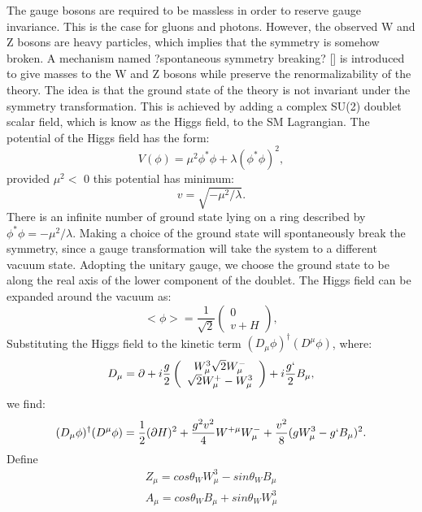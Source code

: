 \documentclass[thesis.tex]{subfiles}
\begin{document}
 
The gauge bosons are required to be massless in order to reserve gauge invariance. 
This is the case for gluons and photons. However, the observed W and Z bosons are heavy particles, which implies that the symmetry is somehow broken. 
A mechanism named ?spontaneous symmetry breaking? [] is introduced to give masses to the W and Z bosons while preserve the renormalizability of the theory. 
The idea is that the ground state of the theory is not invariant under the symmetry transformation.
This is achieved by adding a complex SU(2) doublet scalar field, which is know as the Higgs field, to the SM Lagrangian. 
The potential of the Higgs field has the form: 
	\begin{equation}
		V(\phi) = \mu^2\phi^*\phi + \lambda(\phi^*\phi)^2,
	\end{equation}
provided $\mu^2 <$ 0 this potential has minimum: 
	\begin{equation}
		v = \sqrt{ -\mu^2/\lambda}.
	\end{equation}
There is an infinite number of ground state lying on a ring described by $\phi^*\phi = - \mu^2/\lambda$. 
Making a choice of the ground state will spontaneously break the symmetry, since a gauge transformation will take the system to a different vacuum state. 
Adopting the unitary gauge, we choose the ground state to be along the real axis of the lower component of the doublet.
The Higgs field can be expanded around the vacuum as:
	\begin{equation}
		<\phi> = \frac{1}{\sqrt{2}} \left( \begin{array}{c} 0\\v+H \end{array} \right),
	\end{equation}
Substituting the Higgs field to the kinetic term $(D_\mu \phi)^\dagger(D^\mu\phi)$, where:
	\begin{equation}
		D_\mu = \partial + i\frac{g}{2}\left(  \begin{array}{c} W_\mu^3   \sqrt{2}W_\mu^- \\ \sqrt{2}W_\mu^+  -W_\mu^3 \end{array} \right) + i\frac{g`}{2}B_\mu, 
	\end{equation}
we find:
	\begin{equation}
		(D_\mu \phi)^\dagger(D^\mu\phi) = \frac{1}{2}(\partial H)^2 + \frac{g^2v^2}{4}W^{+\mu}W_{\mu}^- + \frac{v^2}{8}(gW_\mu^3 - g`B_\mu)^2.
	\end{equation}
Define
	\begin{equation}
	\begin{array}{c}
		Z_\mu = cos\theta_W W_\mu^3 - sin \theta_W B_\mu \\
		A_\mu = cos\theta_W B_\mu + sin\theta_W W_\mu^3
	\end{array}
	\end{equation}
\end{document}
